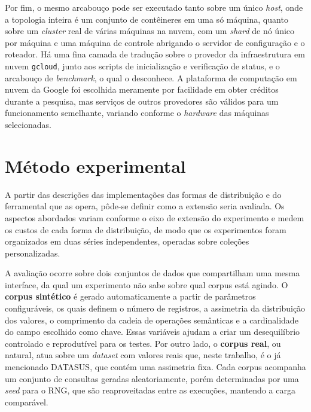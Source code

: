 Por fim, o mesmo arcabouço pode ser executado tanto sobre um único \textit{host}, onde a topologia inteira é um conjunto de contêineres em uma só máquina, quanto sobre um \textit{cluster} real de várias máquinas na nuvem, com um \textit{shard} de nó único por máquina e uma máquina de controle abrigando o servidor de configuração e o roteador. Há uma fina camada de tradução sobre o provedor da infraestrutura em nuvem \texttt{gcloud}, junto aos scripts de inicialização e verificação de status, e o arcabouço de \textit{benchmark}, o qual o desconhece. A plataforma de computação em nuvem da Google foi escolhida meramente por facilidade em obter créditos durante a pesquisa, mas serviços de outros provedores são válidos para um funcionamento semelhante, variando conforme o \textit{hardware} das máquinas selecionadas.

\section{Método experimental}
\label{sec:metodo}

A partir das descrições das implementações das formas de distribuição e do ferramental que as opera, pôde-se definir como a extensão seria avaliada. Os aspectos abordados variam conforme o eixo de extensão do experimento e medem os custos de cada forma de distribuição, de modo que os experimentos foram organizados em duas séries independentes, operadas sobre coleções personalizadas.

A avaliação ocorre sobre dois conjuntos de dados que compartilham uma mesma interface, da qual um experimento não sabe sobre qual corpus está agindo. O \textbf{corpus sintético} é gerado automaticamente a partir de parâmetros configuráveis, os quais definem o número de registros, a assimetria da distribuição dos valores, o comprimento da cadeia de operações semânticas e a cardinalidade do campo escolhido como chave. Essas variáveis ajudam a criar um desequilíbrio controlado e reprodutível para os testes. Por outro lado, o \textbf{corpus real}, ou natural, atua sobre um \textit{dataset} com valores reais que, neste trabalho, é o já mencionado DATASUS, que contém uma assimetria fixa. Cada corpus acompanha um conjunto de consultas geradas aleatoriamente, porém determinadas por uma \textit{seed} para o RNG, que são reaproveitadas entre as execuções, mantendo a carga comparável.

